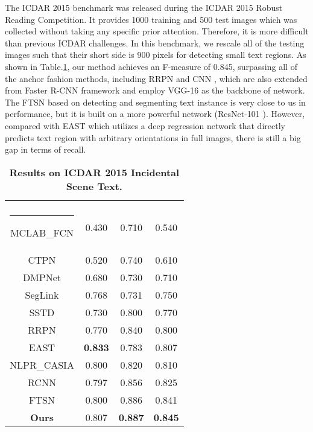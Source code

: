\documentclass[3p, times]{elsarticle}
\makeatletter
\newcommand{\thickhline}{\noalign {\ifnum 0=`}\fi \hrule height 1pt
    \futurelet \reserved@a \@xhline
}
\newcommand{\topcaption}{\setlength{\abovecaptionskip}{0pt}\setlength{\belowcaptionskip}{8pt}\caption}
\makeatother
\begin{document}
The ICDAR 2015 \cite{ICDAR2015} benchmark was released during the ICDAR 2015 Robust Reading Competition. It provides 1000 training and 500 test images which was collected without taking any specific prior attention. Therefore, it is more difficult than previous ICDAR challenges. In this benchmark, we rescale all of the testing images such that their short side is 900 pixels for detecting small text regions. As shown in Table.\ref{Table_3}, our method achieves an F-measure of 0.845, surpassing all of the anchor fashion methods, including RRPN \cite{RRPN2017ARXIV} and CNN \cite{RRCNN2017ARXIV}, which are also extended from Faster R-CNN \cite{FASTERRCNN2015NIPS} framework and employ VGG-16 \cite{VGG2015ICLR} as the backbone of network. The FTSN \cite{FTSN2017ARXIV} based on detecting and segmenting text instance is very close to us in performance, but it is built on a more powerful network (ResNet-101 \cite{RESNET2016CVPR}). However, compared with EAST \cite{EAST2017CVPR} which utilizes a deep regression network that directly predicts text region with arbitrary orientations in full images, there is still a big gap in terms of recall.

\setlength{\tabcolsep}{14pt}
\begin{table}[!htb]
\centering
\topcaption{\textbf{Results on ICDAR 2015 Incidental Scene Text.}}
\label{Table_3}
\begin{tabular}{|c|c|c|c|} 
    \hline
                                &     &  &  \\\thickhline
    MCLAB\_FCN \cite{MTD2016CVPR}       & 0.430       & 0.710       & 0.540       \\\hline
    CTPN \cite{CTPN2016ECCV}            & 0.520       & 0.740       & 0.610       \\\hline
    DMPNet \cite{DMPN2017CVPR}          & 0.680       & 0.730       & 0.710       \\\hline
    SegLink \cite{SEGLINK2017CVPR}      & 0.768       & 0.731       & 0.750       \\\hline
    SSTD \cite{SSTD2017ICCV}            & 0.730       & 0.800       & 0.770       \\\hline
    RRPN \cite{RRPN2017ARXIV}           & 0.770       & 0.840       & 0.800       \\\hline
    EAST \cite{EAST2017CVPR}            & {\bf 0.833} & 0.783       & 0.807       \\\hline
    NLPR\_CASIA \cite{DDR2017ICCV}      & 0.800       & 0.820       & 0.810       \\\hline
    R{}CNN \cite{RRCNN2017ARXIV}  & 0.797       & 0.856       & 0.825       \\\hline
    FTSN \cite{FTSN2017ARXIV}           & 0.800       & 0.886       & 0.841       \\\hline
    \textbf{Ours}                       & 0.807       & {\bf 0.887} & {\bf 0.845} \\\hline
\end{tabular}
\end{table}
\setlength{\tabcolsep}{1.4pt}
\end{document}
